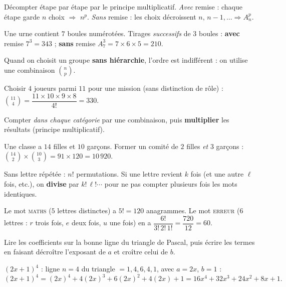 Décompter étape par étape par le principe multiplicatif. \emph{Avec} remise : chaque
étape garde $n$ choix $\Rightarrow$ $n^p$. \emph{Sans} remise : les choix décroissent
$n,\,n-1,\dots\Rightarrow A_n^p$.
\begin{exemple}
Une urne contient $7$ boules numérotées. Tirages \emph{successifs} de $3$ boules :
\textbf{avec} remise $7^3=343$ ; \textbf{sans} remise $A_7^3=7\times 6\times 5=210$.
\end{exemple}

Quand on choisit un groupe \textbf{sans hiérarchie}, l'ordre est indifférent : on
utilise une combinaison $\binom{n}{p}$.
\begin{exemple}
Choisir $4$ joueurs parmi $11$ pour une mission (sans distinction de rôle) :
$\binom{11}{4}=\dfrac{11\times 10\times 9\times 8}{4!}=330$.
\end{exemple}

Compter \emph{dans chaque catégorie} par une combinaison, puis \textbf{multiplier} les
résultats (principe multiplicatif).
\begin{exemple}
Une classe a $14$ filles et $10$ garçons. Former un comité de $2$ filles \emph{et}
$3$ garçons : $\binom{14}{2}\times\binom{10}{3}=91\times 120=10\,920$.
\end{exemple}

Sans lettre répétée : $n!$ permutations. Si une lettre revient $k$ fois (et une
autre $\ell$ fois, etc.), on \textbf{divise} par $k!\,\ell!\cdots$ pour ne pas compter
plusieurs fois les mots identiques.
\begin{exemple}
Le mot \textsc{maths} ($5$ lettres distinctes) a $5!=120$ anagrammes. Le mot
\textsc{erreur} ($6$ lettres : $r$ trois fois, $e$ deux fois, $u$ une fois) en a
$\dfrac{6!}{3!\,2!\,1!}=\dfrac{720}{12}=60$.
\end{exemple}

Lire les coefficients sur la bonne ligne du triangle de Pascal, puis écrire les
termes en faisant décroître l'exposant de $a$ et croître celui de $b$.
\begin{exemple}
$(2x+1)^4$ : ligne $n=4$ du triangle $=1,4,6,4,1$, avec $a=2x$, $b=1$ :
\[ (2x+1)^4=(2x)^4+4(2x)^3+6(2x)^2+4(2x)+1=16x^4+32x^3+24x^2+8x+1. \]
\end{exemple}
